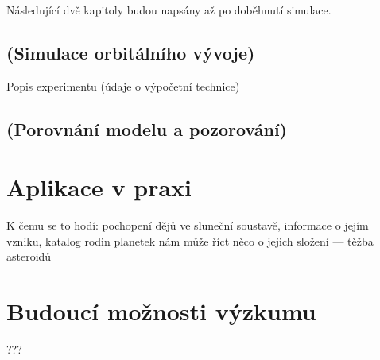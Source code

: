 \documentclass[A4paper, 12pt, oneside]{book}
\begin{document}
Následující dvě kapitoly budou napsány až po doběhnutí simulace. 
\section{(Simulace orbitálního vývoje)}
Popis experimentu (údaje o výpočetní technice)
\section{(Porovnání modelu a pozorování)}

\chapter{Aplikace v praxi} 
K čemu se to hodí: pochopení dějů ve sluneční soustavě, informace o jejím vzniku, katalog rodin planetek nám může říct něco o jejich složení --- těžba asteroidů
\chapter{Budoucí možnosti výzkumu}
???
\printbibliography
\end{document}

